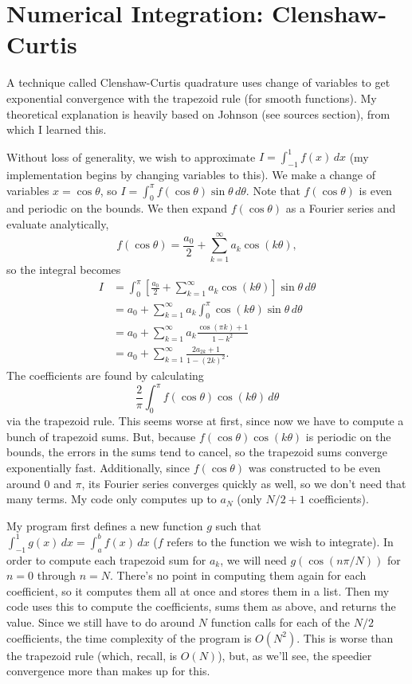 \documentclass[11pt]{article}
\theoremstyle{plain}
\begin{document}
\section{Numerical Integration: Clenshaw-Curtis}
A technique called Clenshaw-Curtis quadrature uses change of variables to get exponential convergence with the trapezoid rule (for smooth functions). My theoretical explanation is heavily based on Johnson (see sources section), from which I learned this.
\par 
Without loss of generality, we wish to approximate $I=\int_{-1}^1 f(x)\, dx$ (my implementation begins by changing variables to this). We make a change of variables $x=\cos \theta$, so $I=\int_0^\pi f(\cos\theta)\sin\theta \, d\theta$. Note that $f(\cos\theta)$ is even and periodic on the bounds. We then expand $f(\cos\theta)$ as a Fourier series and evaluate analytically,
\begin{equation*}
	f(\cos\theta)=\frac{a_0}{2}+\sum_{k=1}^\infty a_k\cos(k\theta),
\end{equation*}
so the integral becomes
\begin{align*}
	I &= \int_0^\pi \left[\frac{a_0}{2}+\sum_{k=1}^\infty a_k\cos(k\theta) \right]\sin\theta \, d\theta\\
	&= a_0 + \sum_{k=1}^\infty a_k \int_0^\pi \cos(k\theta)\sin\theta\,d\theta \\
	&= a_0 + \sum_{k=1}^\infty a_k \frac{\cos(\pi k)+1}{1-k^2} \\
	&= a_0 + \sum_{k=1}^\infty \frac{2a_{2k}+1}{1-(2k)^2}.
\end{align*}
The coefficients are found by calculating
\begin{equation*}
	\frac{2}{\pi}\int_0^\pi f(\cos\theta)\cos(k\theta)\,d\theta
\end{equation*}
via the trapezoid rule. This seems worse at first, since now we have to compute a bunch of trapezoid sums. But, because $f(\cos\theta)\cos(k\theta)$ is periodic on the bounds, the errors in the sums tend to cancel, so the trapezoid sums converge exponentially fast. Additionally, since $f(\cos\theta)$ was constructed to be even around $0$ and $\pi$, its Fourier series converges quickly as well, so we don't need that many terms. My code only computes up to $a_N$ (only $N/2+1$ coefficients).
\par
My program first defines a new function $g$ such that $\int_{-1}^1 g(x)\,dx = \int_a^b f(x)\,dx$ ($f$ refers to the function we wish to integrate). In order to compute each trapezoid sum for $a_k$, we will need $g(\cos(n\pi/N))$ for $n=0$ through $n=N$. There's no point in computing them again for each coefficient, so it computes them all at once and stores them in a list. Then my code uses this to compute the coefficients, sums them as above, and returns the value. Since we still have to do around $N$ function calls for each of the $N/2$ coefficients, the time complexity of the program is $O(N^2)$. This is worse than the trapezoid rule (which, recall, is $O(N)$), but, as we'll see, the speedier convergence more than makes up for this.
\end{document}
